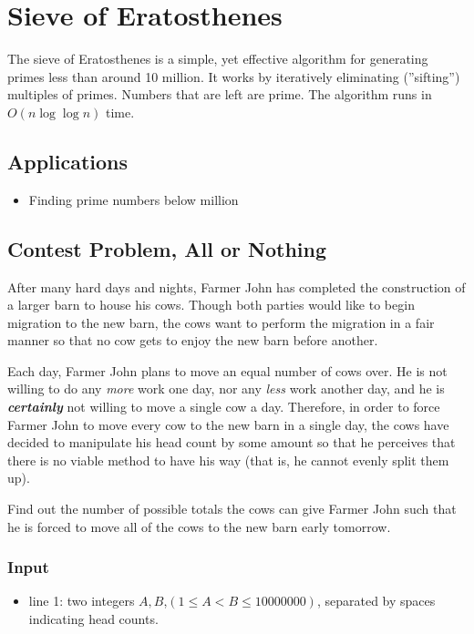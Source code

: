 \section{Sieve of Eratosthenes}
The sieve of Eratosthenes is a simple, yet effective algorithm for generating primes less than around 10 million.
It works by iteratively eliminating (''sifting'') multiples of primes.
Numbers that are left are prime.
The algorithm runs in $O(n\log\log n)$ time.

\subsection{Applications}
\begin{itemize}
	\item	Finding prime numbers below  million
\end{itemize}

\subsection{Contest Problem, All or Nothing}
After many hard days and nights, Farmer John has completed the construction of a larger barn to house his cows.
Though both parties would like to begin migration to the new barn, the cows want to perform the migration in a fair manner so that no cow gets to enjoy the new barn before another.

Each day, Farmer John plans to move an equal number of cows over.
He is not willing to do any \textit{more} work one day, nor any \textit{less} work another day, and he is \textbf{\textit{certainly}} not willing to move a single cow a day.
Therefore, in order to force Farmer John to move every cow to the new barn in a single day, the cows have decided to manipulate his head count by some amount so that he perceives that there is no viable method to have his way (that is, he cannot evenly split them up).

Find out the number of possible totals the cows can give Farmer John such that he is forced to move all of the cows to the new barn early tomorrow.

\subsubsection{Input}
\begin{itemize}
	\item line 1: two integers $A,B$,$(1 \leq A < B \leq 10000000)$, separated by spaces indicating head counts.
\end{itemize}

